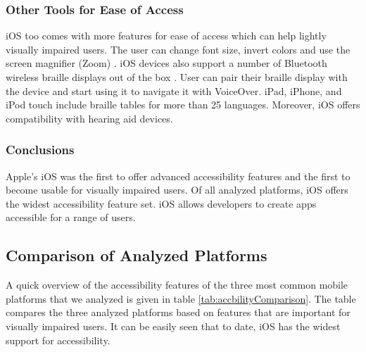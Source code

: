 \subsubsection{Other Tools for Ease of Access}
iOS too comes with more features for ease of access which can help lightly visually impaired users. The user can change font size, invert colors and use the screen magnifier (Zoom) \cite{iosAccbility}.
iOS devices also support a number of Bluetooth wireless braille displays out of the box \cite{iosAccbility}. User can pair their braille display with the device and start using it to navigate it with VoiceOver. iPad, iPhone, and iPod touch include braille tables for more than 25 languages. Moreover, iOS offers compatibility with hearing aid devices.

\subsubsection{Conclusions}
Apple's iOS was the first to offer advanced accessibility features and the first to become usable for visually impaired users. Of all analyzed platforms, iOS offers the widest accessibility feature set. iOS allows developers to create apps accessible for a range of users.

\subsection{Comparison of Analyzed Platforms}
A quick overview of the accessibility features of the three most common mobile platforms that we analyzed is given in table \ref{tab:accbilityComparison}. The table compares the three analyzed platforms based on features that are important for visually impaired users. It can be easily seen that to date, iOS has the widest support for accessibility.




